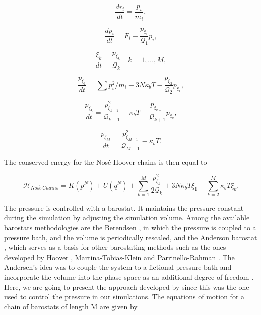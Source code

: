 \begin{equation}
\frac{dr_{i}}{dt} = \frac{p_i}{m_i},
\end{equation}

\begin{equation}
\frac{dp_{i}}{dt} = F_i  - \frac{p_{\xi _{1}}}{\mathcal{Q} _1} p_{i},
\end{equation}

\begin{equation}
\frac{\xi _{k}}{dt} = \frac{p_{\xi _k}}{\mathcal{Q} _{k}} \quad k = 1,...,M ,
\end{equation}

\begin{equation}
\frac{p_{\xi _1}}{dt} = {\sum p_{i}^{2}/m_{i} - 3N\kappa_{b}T} -  \frac{p_{\xi _{2}}}{\mathcal{Q} _2}p_{\xi _{1}},
\end{equation}

\begin{equation}
\frac{p_{\xi _k}}{dt} = \frac{p_{\xi _{k -1}}^{2}}{\mathcal{Q} _{k-1}} - \kappa_{b}T - \frac{p_{\xi _{k+1}}}{\mathcal{Q} _{k+1}}p_{\xi _{k}},
\end{equation}

\begin{equation}
\frac{p_{\xi _M}}{dt} = \frac{ p_{\xi _{M-1}}^{2}}{\mathcal{Q} _{M-1}} - \kappa_{b}T .
\end{equation}

The conserved energy for the Nos\'{e} Hoover chains is then equal to

\begin{equation}
\mathcal{H}_{Nos\acute{e} \, Chains} =  K(p^{N}) + U(q^{N})  + \sum_{k=1}^{M }\frac{p^{2}_{\xi _{k}}}{2\mathcal{Q} _{k}} + 3N\kappa_{b}T \xi _{1} + \sum_{k=2}^{M} \kappa_{b}T \xi _{k}.
\end{equation}

The pressure is controlled with a barostat. It maintains the pressure constant during the simulation by adjusting the simulation volume. Among the available  barostats methodologies are the Berendsen \cite{doi:10.1063/1.448118}, in which the pressure is coupled to a pressure bath, and the volume is periodically rescaled, and the Anderson barostat \cite{1980JChPh722384A}, which serves as a basis for other barostating methods such as the ones developed by Hoover \cite{PhysRevA.31.1695}, Martina-Tobias-Klein \cite{doi:10.1063/1.467468} and Parrinello-Rahman \cite{doi:10.1063/1.328693}. The Andersen's idea was to couple the system to a fictional pressure bath and incorporate the volume into the phase space as an additional degree of freedom \cite{tuckerman}. Here, we are going to present the approach developed by  since this was the one used to control the pressure in our simulations. The equations of motion for a chain of barostats of length M are given by  

